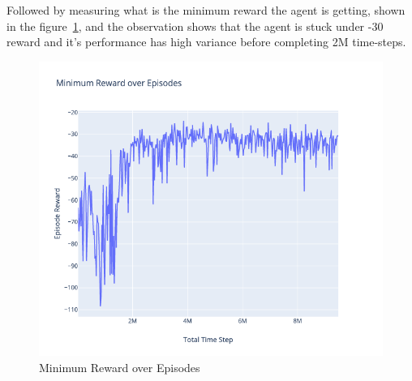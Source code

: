 Followed by measuring what is the minimum reward the agent is getting, shown in the figure~\ref{fig:1st_exp_min_eps_reward}, and the observation shows that the agent is stuck under -30 reward and it's performance has high variance before completing 2M time-steps.
\begin{figure}[H]
	\centering
	\includegraphics[width=\linewidth]{figures/exps/1st_exp/min_eps_reward}
	\caption{Minimum Reward over Episodes}
	\label{fig:1st_exp_min_eps_reward}
\end{figure}

